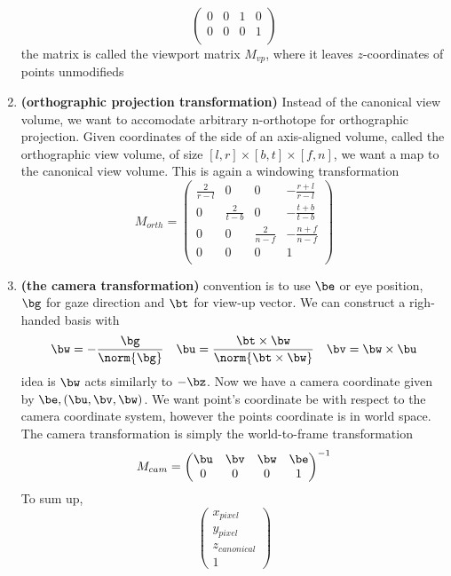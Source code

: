 \documentclass[11pt]{article}
\newcommand{\bheading}[1]{\textbf{(#1)}}
\begin{document}
\begin{enumerate}
\[\begin{pmatrix}
            0 & 0 & 1 & 0 \\
            0 & 0 & 0 & 1 \\
        \end{pmatrix}
    \]
    the matrix is called the viewport matrix $M_{vp}$, where it leaves $z$-coordinates of points unmodifieds
    \item \bheading{orthographic projection transformation} Instead of the canonical view volume, we want to accomodate arbitrary n-orthotope for orthographic projection. Given coordinates of the side of an axis-aligned volume, called the orthographic view volume, of size $[l,r] \times [b,t] \times [f,n]$, we want a map to the canonical view volume. This is again a windowing transformation
    \[
        M_{orth} = 
        \begin{pmatrix}
            \frac{2}{r-l} & 0 & 0 & -\frac{r+l}{r-l} \\
            0 & \frac{2}{t-b} & 0 & -\frac{t+b}{t-b} \\
            0 & 0 & \frac{2}{n-f} & -\frac{n+f}{n-f} \\
            0 & 0 & 0 & 1 \\
        \end{pmatrix}
    \]
    \item \bheading{the camera transformation} convention is to use $\be$ or eye position, $\bg$ for gaze direction and $\bt$ for view-up vector. We can construct a righ-handed basis with 
    \[
        \bw = -\frac{\bg}{\norm{\bg}}
        \quad 
        \bu = \frac{\bt \times \bw}{\norm{\bt \times \bw}}
        \quad
        \bv = \bw \times \bu
    \]
    idea is $\bw$ acts similarly to $-\bz$. Now we have a camera coordinate given by $\be, (\bu,\bv,\bw)$. We want point's coordinate be with respect to the camera coordinate system, however the points coordinate is in world space. The camera transformation is simply the world-to-frame transformation
    \[
        M_{cam} =
        \begin{pmatrix}
            \bu & \bv & \bw & \be \\
            0 & 0 & 0 & 1 \\
        \end{pmatrix}^{-1}
    \]
    To sum up, 
    \[
        \begin{pmatrix}
            x_{pixel} \\ y_{pixel} \\ z_{canonical} \\ 1

\end{pmatrix}\]
\end{enumerate}
\end{document}
